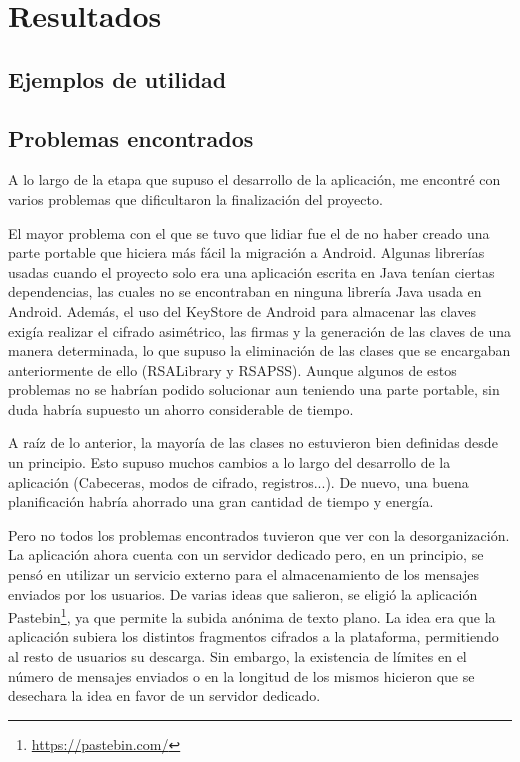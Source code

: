 
\chapter{Resultados} %

\label{Chapter5} %


\section{Ejemplos de utilidad}


\section{Problemas encontrados}

A lo largo de la etapa que supuso el desarrollo de la aplicación, me encontré
con varios problemas que dificultaron la finalización del proyecto.

El mayor problema con el que se tuvo que lidiar fue el de no haber creado una
parte portable que hiciera más fácil la migración a Android. Algunas librerías
usadas cuando el proyecto solo era una aplicación escrita en Java tenían ciertas
dependencias, las cuales no se encontraban en ninguna librería Java usada en
Android. Además, el uso del KeyStore de Android para almacenar las claves
exigía realizar el cifrado asimétrico, las firmas y la generación de las claves
de una manera determinada, lo que supuso la eliminación de las clases que se
encargaban anteriormente de ello (RSALibrary y RSAPSS). Aunque algunos de estos
problemas no se habrían podido solucionar aun teniendo una parte portable, sin
duda habría supuesto un ahorro considerable de tiempo.

A raíz de lo anterior, la mayoría de las clases no estuvieron bien definidas
desde un principio. Esto supuso muchos cambios a lo largo del desarrollo de la
aplicación (Cabeceras, modos de cifrado, registros...). De nuevo, una buena
planificación habría ahorrado una gran cantidad de tiempo y energía.

Pero no todos los problemas encontrados tuvieron que ver con la desorganización.
La aplicación ahora cuenta con un servidor dedicado pero, en un principio, se
pensó en utilizar un servicio externo para el almacenamiento de los mensajes
enviados por los usuarios. De varias ideas que salieron, se eligió la aplicación
Pastebin\footnote{\url{https://pastebin.com/}}, ya que permite la subida anónima de
texto plano. La idea era que la aplicación subiera los distintos fragmentos
cifrados a la plataforma, permitiendo al resto de usuarios su descarga. Sin
embargo, la existencia de límites en el número de mensajes enviados o en la
longitud de los mismos hicieron que se desechara la idea en favor de un
servidor dedicado.

